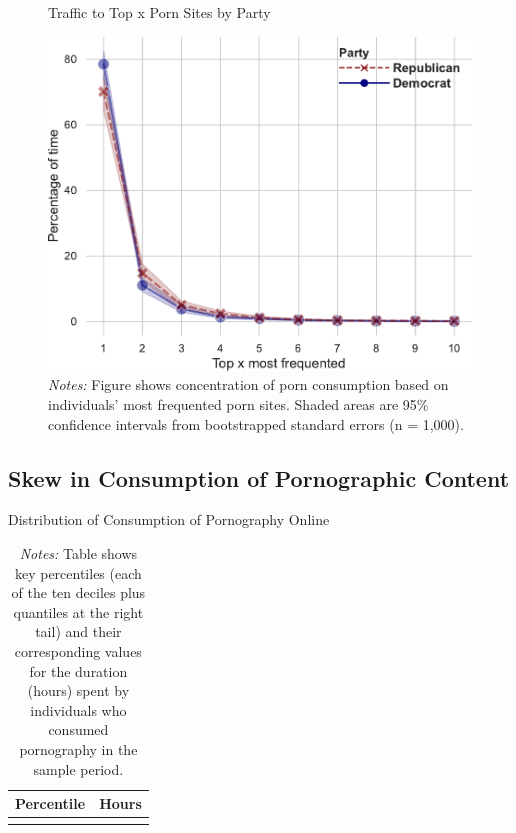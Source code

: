 \documentclass[12pt, letterpaper]{article}
\begin{document}
\begin{figure}
	\centering
	\caption{Traffic to Top x Porn Sites by Party}
	\includegraphics[width=.6\textwidth]{../figs/concentration_porn_consumption_topX_by_party.pdf}
	\caption*{\footnotesize \emph{Notes:} 
		Figure shows concentration of porn consumption based on individuals' most frequented porn sites.
		Shaded areas are 95\% confidence intervals from bootstrapped standard errors (n = 1,000).
	}
	\label{fig:concentration_porn_consumption_topX_by_party}
\end{figure}


\FloatBarrier
\subsection{Skew in Consumption of Pornographic Content}
\begin{table}[ht] \centering \small \setlength\tabcolsep{10 pt}
	\caption{Distribution of Consumption of Pornography Online}
	\label{tab:distribution_duration}
	\begin{adjustbox}{max width=\textwidth}
		\begin{tabular}{cr}
			\toprule
			\multicolumn{1}{c}{\textbf{Percentile}}&\multicolumn{1}{c}{\textbf{Hours}}\\
			\midrule
			\\
			\bottomrule
		\end{tabular}
	\end{adjustbox}
	\caption*{\footnotesize \emph{Notes:} 
		Table shows key percentiles (each of the ten deciles plus quantiles at the right tail) and their corresponding values for the duration (hours) spent by individuals who consumed pornography in the sample period. 
	}
\end{table}
\end{document}
